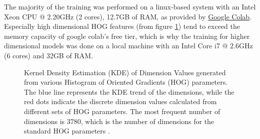 The majority of the training was performed on a linux-based system with an Intel Xeon CPU @ 2.20GHz (2 cores), 12.7GB of RAM, as provided by \href{https://colab.research.google.com/}{Google Colab}. Especially high dimensional HOG features (from figure \ref{fig:dimension_distribution}) tend to exceed the memory capacity of google colab's free tier, which is why the training for higher dimensional models was done on a local machine with an Intel Core i7 @ 2.6GHz (6 cores) and 32GB of RAM.

\begin{figure}
    
    \caption{Kernel Density Estimation (KDE) of Dimension Values generated from various Histogram of Oriented Gradients (HOG) parameters. The blue line represents the KDE trend of the dimensions, while the red dots indicate the discrete dimension values calculated from different sets of HOG parameters. The most frequent number of dimensions is 3780, which is the number of dimensions for the standard HOG parameters \cite{dalal_2005_histograms}.}
    \label{fig:dimension_distribution}
\end{figure}